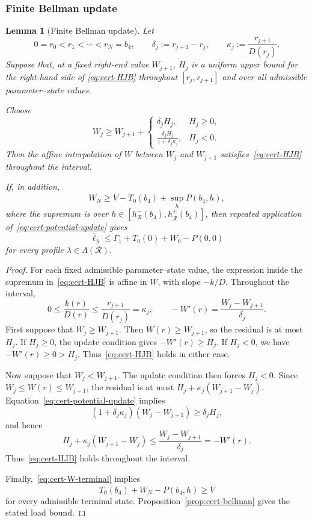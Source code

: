 \documentclass[11pt]{article}
\newtheorem{lemma}[theorem]{Lemma}
\theoremstyle{definition}
\theoremstyle{remark}
\begin{document}
\subsubsection{Finite Bellman update}

\begin{lemma}[Finite Bellman update]
\label{lem:cert-bellman-update}
Let
\[
 0=r_0<r_1<\cdots<r_N=b_4,
 \qquad
 \delta_j:=r_{j+1}-r_j,
 \qquad
 \kappa_j:=\frac{r_{j+1}}{D(r_j)}.
\]
Suppose that, at a fixed right-end value $W_{j+1}$,
$H_j$ is a uniform upper bound for the right-hand side of
\eqref{eq:cert-HJB} throughout
$[r_j,r_{j+1}]$ and over all admissible parameter--state values.

Choose
\begin{equation}\label{eq:cert-potential-update}
 W_j\ge W_{j+1}+
 \begin{cases}
  \delta_j H_j,
      &H_j\ge0,\\[2mm]
  \displaystyle
  \frac{\delta_jH_j}{1+\delta_j\kappa_j},
      &H_j<0.
 \end{cases}
\end{equation}
Then the affine interpolation of $W$ between $W_j$ and $W_{j+1}$
satisfies~\eqref{eq:cert-HJB} throughout the interval.

If, in addition,
\begin{equation}\label{eq:cert-W-terminal}
 W_N\ge
 \overline V-T_0(b_4)+\sup_hP(b_4,h),
\end{equation}
where the supremum is over
$h\in[h^-_{\mathcal R}(b_4),h^+_{\mathcal R}(b_4)]$, then repeated
application of~\eqref{eq:cert-potential-update} gives
\[
 \overline\ell_\lambda
 \le
 \Gamma_1+T_0(0)+W_0-P(0,0)
\]
for every profile $\lambda\in\Lambda(\mathcal R)$.
\end{lemma}

\begin{proof}
For each fixed admissible parameter--state value, the expression
inside the supremum in~\eqref{eq:cert-HJB} is affine in $W$,
with slope $-k/D$.  Throughout the interval,
\[
 0\le\frac{k(r)}{D(r)}\le\frac{r_{j+1}}{D(r_j)}=\kappa_j,
 \qquad -W'(r)=\frac{W_j-W_{j+1}}{\delta_j}.
\]
First suppose that $W_j\ge W_{j+1}$.
Then $W(r)\ge W_{j+1}$, so the residual is at most $H_j$.
If $H_j\ge0$, the update condition gives $-W'(r)\ge H_j$.
If $H_j<0$, we have $-W'(r)\ge0>H_j$.
Thus~\eqref{eq:cert-HJB} holds in either case.

Now suppose that $W_j<W_{j+1}$.  The update condition then
forces $H_j<0$.  Since $W_j\le W(r)\le W_{j+1}$, the residual
is at most $H_j+\kappa_j(W_{j+1}-W_j)$.
Equation~\eqref{eq:cert-potential-update} implies
\[
 (1+\delta_j\kappa_j)(W_j-W_{j+1})\ge\delta_jH_j,
\]
and hence
\[
 H_j+\kappa_j(W_{j+1}-W_j)
 \le\frac{W_j-W_{j+1}}{\delta_j}=-W'(r).
\]
Thus~\eqref{eq:cert-HJB} holds throughout the interval.

Finally,~\eqref{eq:cert-W-terminal} implies
\[
 T_0(b_4)+W_N-P(b_4,h)\ge\overline V
\]
for every admissible terminal state.
Proposition~\ref{prop:cert-bellman} gives the stated load bound.
\end{proof}
\end{document}
